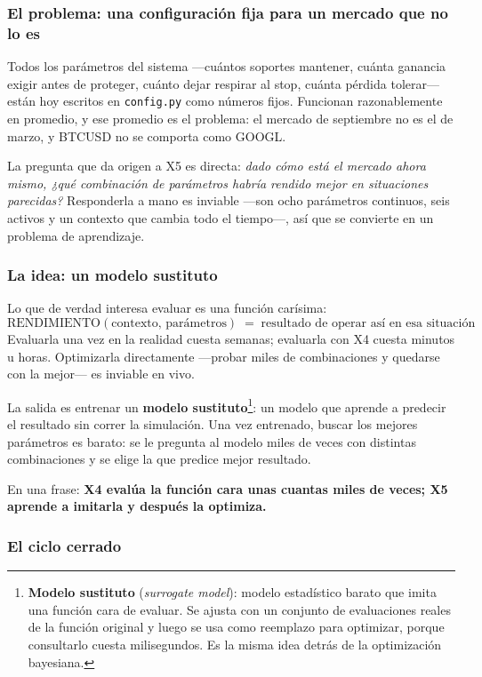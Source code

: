 \documentclass[11pt,a4paper]{article}
\newcommand{\code}[1]{\texttt{\small #1}}
\newcommand{\bigsep}{\par\vspace{3pt}}
\begin{document}
\subsubsection{El problema: una configuración fija para un mercado que no lo es}

Todos los parámetros del sistema —cuántos soportes mantener, cuánta ganancia exigir antes de
proteger, cuánto dejar respirar al stop, cuánta pérdida tolerar— están hoy escritos en
\code{config.py} como números fijos. Funcionan razonablemente en promedio, y ese promedio es
el problema: el mercado de septiembre no es el de marzo, y BTCUSD no se comporta como GOOGL.

\bigsep
La pregunta que da origen a X5 es directa: \textit{dado cómo está el mercado ahora mismo,
¿qué combinación de parámetros habría rendido mejor en situaciones parecidas?} Responderla a
mano es inviable —son ocho parámetros continuos, seis activos y un contexto que cambia todo
el tiempo—, así que se convierte en un problema de aprendizaje.

\subsubsection{La idea: un modelo sustituto}

Lo que de verdad interesa evaluar es una función carísima:
\[
\text{RENDIMIENTO}(\text{contexto},\, \text{parámetros}) \;=\; \text{resultado de operar así en esa situación}
\]
Evaluarla una vez en la realidad cuesta semanas; evaluarla con X4 cuesta minutos u horas.
Optimizarla directamente —probar miles de combinaciones y quedarse con la mejor— es
inviable en vivo.

\bigsep
La salida es entrenar un \textbf{modelo sustituto}\footnote{\textbf{Modelo sustituto}
(\textit{surrogate model}): modelo estadístico barato que imita una función cara de evaluar.
Se ajusta con un conjunto de evaluaciones reales de la función original y luego se usa como
reemplazo para optimizar, porque consultarlo cuesta milisegundos. Es la misma idea detrás
de la optimización bayesiana.}: un modelo que aprende a predecir el resultado sin correr la
simulación. Una vez entrenado, buscar los mejores parámetros es barato: se le pregunta al
modelo miles de veces con distintas combinaciones y se elige la que predice mejor
resultado.

\bigsep
En una frase: \textbf{X4 evalúa la función cara unas cuantas miles de veces; X5 aprende a
imitarla y después la optimiza.}

\subsubsection{El ciclo cerrado}
\end{document}
